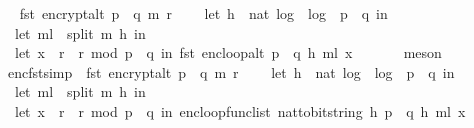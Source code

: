 \begin{isabellebody}
\ \isamarkupfalse%
\ {\isachardoublequoteopen}fst\ {\isacharparenleft}{\kern0pt}encrypt{\isacharunderscore}{\kern0pt}alt\ {\isacharparenleft}{\kern0pt}p\ {\isacharasterisk}{\kern0pt}\ q{\isacharparenright}{\kern0pt}\ m\ r{\isacharparenright}{\kern0pt}\ \isanewline
\ \ {\isacharequal}{\kern0pt}\ {\isacharparenleft}{\kern0pt}let\ h\ {\isacharequal}{\kern0pt}\ nat\ {\isasymlfloor}log\ {}\ {\isacharparenleft}{\kern0pt}log\ {}\ {\isacharparenleft}{\kern0pt}p\ {\isacharasterisk}{\kern0pt}\ q{\isacharparenright}{\kern0pt}{\isacharparenright}{\kern0pt}{\isasymrfloor}\ in\ \isanewline
\ \ let\ m{\isacharunderscore}{\kern0pt}l\ {\isacharequal}{\kern0pt}\ split\ m\ h\ in\ \isanewline
\ \ let\ x{\isacharunderscore}{\kern0pt}{}\ {\isacharequal}{\kern0pt}\ {\isacharparenleft}{\kern0pt}r\ {\isacharasterisk}{\kern0pt}\ r{\isacharparenright}{\kern0pt}\ mod\ {\isacharparenleft}{\kern0pt}p\ {\isacharasterisk}{\kern0pt}\ q{\isacharparenright}{\kern0pt}\ in\ fst\ {\isacharparenleft}{\kern0pt}enc{\isacharunderscore}{\kern0pt}loop{\isacharunderscore}{\kern0pt}alt\ {\isacharparenleft}{\kern0pt}p\ {\isacharasterisk}{\kern0pt}\ q{\isacharcomma}{\kern0pt}\ h{\isacharcomma}{\kern0pt}\ m{\isacharunderscore}{\kern0pt}l{\isacharparenright}{\kern0pt}\ x{\isacharunderscore}{\kern0pt}{}{\isacharparenright}{\kern0pt}{\isacharparenright}{\kern0pt}{\isachardoublequoteclose}\ \isanewline
\ \ \ \ \isamarkupfalse%
\ meson\isanewline
\ \ \isanewline
\ \ \isamarkupfalse%
\ \isamarkupfalse%
\ enc{\isacharunderscore}{\kern0pt}fst{\isacharunderscore}{\kern0pt}simp{\isacharcolon}{\kern0pt}\ \ {\isachardoublequoteopen}fst\ {\isacharparenleft}{\kern0pt}encrypt{\isacharunderscore}{\kern0pt}alt\ {\isacharparenleft}{\kern0pt}p\ {\isacharasterisk}{\kern0pt}\ q{\isacharparenright}{\kern0pt}\ m\ r{\isacharparenright}{\kern0pt}\ \isanewline
\ \ {\isacharequal}{\kern0pt}\ {\isacharparenleft}{\kern0pt}let\ h\ {\isacharequal}{\kern0pt}\ nat\ {\isasymlfloor}log\ {}\ {\isacharparenleft}{\kern0pt}log\ {}\ {\isacharparenleft}{\kern0pt}p\ {\isacharasterisk}{\kern0pt}\ q{\isacharparenright}{\kern0pt}{\isacharparenright}{\kern0pt}{\isasymrfloor}\ in\ \isanewline
\ \ let\ m{\isacharunderscore}{\kern0pt}l\ {\isacharequal}{\kern0pt}\ split\ m\ h\ in\ \isanewline
\ \ let\ x{\isacharunderscore}{\kern0pt}{}\ {\isacharequal}{\kern0pt}\ {\isacharparenleft}{\kern0pt}r\ {\isacharasterisk}{\kern0pt}\ r{\isacharparenright}{\kern0pt}\ mod\ {\isacharparenleft}{\kern0pt}p\ {\isacharasterisk}{\kern0pt}\ q{\isacharparenright}{\kern0pt}\ in\ enc{\isacharunderscore}{\kern0pt}loop{\isacharunderscore}{\kern0pt}func{\isacharunderscore}{\kern0pt}list\ {\isacharparenleft}{\kern0pt}nat{\isacharunderscore}{\kern0pt}to{\isacharunderscore}{\kern0pt}bitstring\ h{\isacharcomma}{\kern0pt}\ p\ {\isacharasterisk}{\kern0pt}\ q{\isacharcomma}{\kern0pt}\ h{\isacharcomma}{\kern0pt}\ m{\isacharunderscore}{\kern0pt}l{\isacharparenright}{\kern0pt}\ x{\isacharunderscore}{\kern0pt}{}{\isacharparenright}{\kern0pt}{\isachardoublequoteclose}\isanewline

\end{isabellebody}
